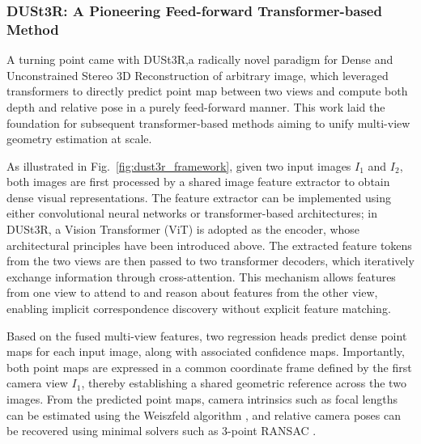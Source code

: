 \subsubsection*{DUSt3R: A Pioneering Feed-forward Transformer-based Method}
A turning point came with DUSt3R,a radically novel paradigm for Dense and Unconstrained Stereo 3D Reconstruction of arbitrary image\cite{2024dust3r}, which leveraged transformers to directly predict point map between two views and compute both depth and relative pose in a purely feed-forward manner. This work laid the foundation for subsequent transformer-based methods aiming to unify multi-view geometry estimation at scale.\cite{lin2025da3}

As illustrated in Fig.~\ref{fig:dust3r_framework}, given two input images $I_1$ and $I_2$, both images are first processed by a shared image feature extractor to obtain dense visual representations. The feature extractor can be implemented using either convolutional neural networks or transformer-based architectures; in DUSt3R, a Vision Transformer (ViT) is adopted as the encoder, whose architectural principles have been introduced above.
The extracted feature tokens from the two views are then passed to two transformer decoders, which iteratively exchange information through cross-attention. This mechanism allows features from one view to attend to and reason about features from the other view, enabling implicit correspondence discovery without explicit feature matching.

Based on the fused multi-view features, two regression heads predict dense point maps for each input image, along with associated confidence maps. Importantly, both point maps are expressed in a common coordinate frame defined by the first camera view $I_1$, thereby establishing a shared geometric reference across the two images. From the predicted point maps, camera intrinsics such as focal lengths can be estimated using the Weiszfeld algorithm \cite{weiszfeld1937point}, and relative camera poses can be recovered using minimal solvers such as 3-point RANSAC \cite{nister2004fivepointmethod,matas2005ransac}.

